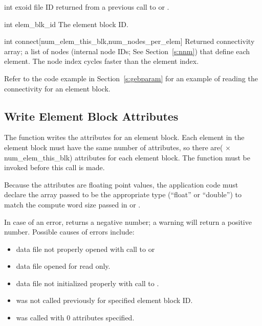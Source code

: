 \begin{parameters}
\item[{int exoid \R{}}]
\exo{} file ID returned from a previous call to 
or .

\item[{int elem_blk_id \R{}}]
The element block ID.

\item[{int connect[num_elem_this_blk,num_nodes_per_elem] \W{}}]
Returned connectivity array; a list of nodes (internal node
IDs; See Section~\ref{s:nnm}) that define each element. The
node index cycles faster than the element index.
\end{parameters}

Refer to the code example in Section~\ref{s:gebparam} for an example
of reading the connectivity for an element block.


\subsection{Write Element Block Attributes}

The function  writes the attributes for an
element block. Each element in the element block must have the same
number of attributes, so there are( $\times$
{num_elem_this_blk}) attributes for each element block. The
function  must be invoked before this call
is made.

Because the attributes are floating point values, the application code
must declare the array passed to be the appropriate type (``float'' or
``double'') to match the compute word size passed in
 or .

In case of an error,  returns a negative
number; a warning will return a positive number. Possible causes of
errors include:

\begin{itemize}

 \item data file not properly opened with call to 
or 

 \item data file opened for read only.

 \item data file not initialized properly with call to
 .

 \item {} was not called previously for
 specified element block ID.

 \item {} was called with 0 attributes
 specified.
\end{itemize}

